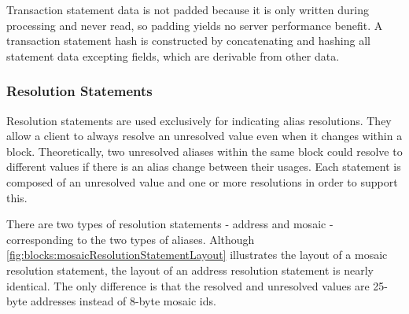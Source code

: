 \begin{figure}[H]
\end{figure}

Transaction statement data is not padded because it is only written during processing and never read, so padding yields no server performance benefit.
A transaction statement hash is constructed by concatenating and hashing all statement data excepting  fields, which are derivable from other data.

\subsubsection{Resolution Statements}

Resolution statements are used exclusively for indicating alias resolutions.
They allow a client to always resolve an unresolved value even when it changes within a block.
Theoretically, two unresolved aliases within the same block could resolve to different values if there is an alias change between their usages.
Each statement is composed of an unresolved value and one or more resolutions in order to support this.

There are two types of resolution statements - address and mosaic - corresponding to the two types of aliases.
Although \autoref{fig:blocks:mosaicResolutionStatementLayout} illustrates the layout of a mosaic resolution statement, the layout of an address resolution statement is nearly identical.
The only difference is that the resolved and unresolved values are 25-byte addresses instead of 8-byte mosaic ids.

